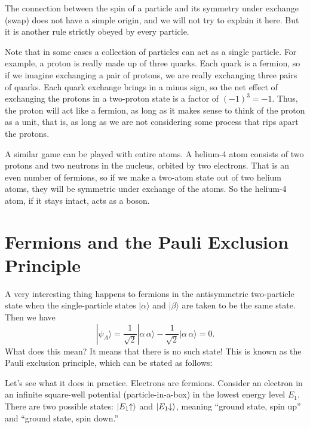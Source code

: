 The connection between the spin of a particle and its symmetry under
exchange (swap) does not have a simple origin, and we will not try to
explain it here.  But it is another rule strictly obeyed by every
particle.

Note that in some cases a collection of particles can act as a single
particle.  For example, a proton is really made up of three quarks.
Each quark is a fermion, so if we imagine exchanging a pair of
protons, we are really exchanging three pairs of quarks.  Each quark
exchange brings in a minus sign, so the net effect of exchanging the
protons in a two-proton state is a factor of $(-1)^3=-1$.  Thus, the proton
will act like a fermion, as long as it makes sense to think of the
proton as a unit, that is, as long as we are not considering some process
that rips apart the protons.

A similar game can be played with entire atoms.  A helium-4 atom
consists of two protons and two neutrons in the nucleus, orbited
by two electrons.  That is an even number of fermions, so if we make a
two-atom state out of two helium atoms, they will be symmetric under
exchange of the atoms.  So the helium-4 atom, if it stays intact, acts
as a boson.

\section{Fermions and the Pauli Exclusion Principle}
\label{sec:~pauli_exclusion_principle}

A very interesting thing happens to fermions in the antisymmetric
two-particle state when the single-particle states $|\alpha\rangle$
and $|\beta\rangle$ are taken to be the same state.  Then we have
\begin{equation}
  |\psi_A\rangle =  \frac{1}{\sqrt 2}|\alpha\, \alpha\rangle - 
  \frac{1}{\sqrt 2}|\alpha\, \alpha\rangle
  = 0.
\end{equation}
What does this mean?  It means that there is no such state!  This is
known as the Pauli exclusion principle, which can be stated as
follows:


Let's see what it does in practice.  Electrons are fermions.  Consider
an electron in an infinite square-well potential (particle-in-a-box)
in the lowest energy level $E_1$. 
There are
two possible states: $|E_1\hspace{-1mm}\uparrow\rangle$ and
$|E_1\hspace{-1mm}\downarrow\rangle$, meaning ``ground state,
spin up'' and ``ground state, spin down.''

